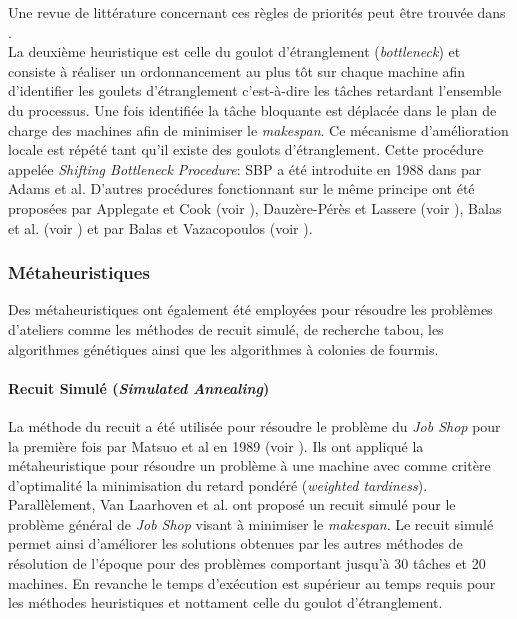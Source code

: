 Une revue de littérature concernant ces règles de priorités peut être trouvée dans \cite{Panwalkar1977}.\\

La deuxième heuristique est celle du goulot d'étranglement (\textit{bottleneck}) et consiste à réaliser un ordonnancement au plus tôt sur chaque machine afin d'identifier les goulets d'étranglement c'est-à-dire les tâches retardant l'ensemble du processus. Une fois identifiée la tâche bloquante est déplacée dans le plan de charge des machines afin de minimiser le \textit{makespan}. Ce mécanisme d'amélioration locale est répété tant qu'il existe des goulots d'étranglement. Cette procédure appelée \textit{Shifting Bottleneck Procedure}: SBP a été introduite en 1988 dans \cite{Adams1988} par Adams et al. D'autres procédures fonctionnant sur le même principe ont été proposées par Applegate et Cook (voir \cite{Applegate1991}), Dauzère-Pérès et Lassere (voir \cite{Dauzere1993}), Balas et al. (voir \cite{Balas1995}) et par Balas et Vazacopoulos (voir \cite{Balas1998}).

\subsubsection{Métaheuristiques}

Des métaheuristiques ont également été employées pour résoudre les problèmes d'ateliers comme les méthodes de recuit simulé, de recherche tabou, les algorithmes génétiques ainsi que les algorithmes à colonies de fourmis.

\paragraph{Recuit Simulé (\textit{Simulated Annealing})}

La méthode du recuit a été utilisée pour résoudre le problème du \textit{Job Shop} pour la première fois par Matsuo et al en 1989 (voir \cite{Matsuo1989}). Ils ont appliqué la métaheuristique pour résoudre un problème à une machine avec comme critère d'optimalité la minimisation du retard pondéré (\textit{weighted tardiness}). Parallèlement, Van Laarhoven et al. ont proposé un recuit simulé pour le problème général de \textit{Job Shop} visant à minimiser le \textit{makespan}. Le recuit simulé permet ainsi d'améliorer les solutions obtenues par les autres méthodes de résolution de l'époque pour des problèmes comportant jusqu'à 30 tâches et 20 machines. En revanche le temps d'exécution est supérieur au temps requis pour les méthodes heuristiques et nottament celle du goulot d'étranglement.

